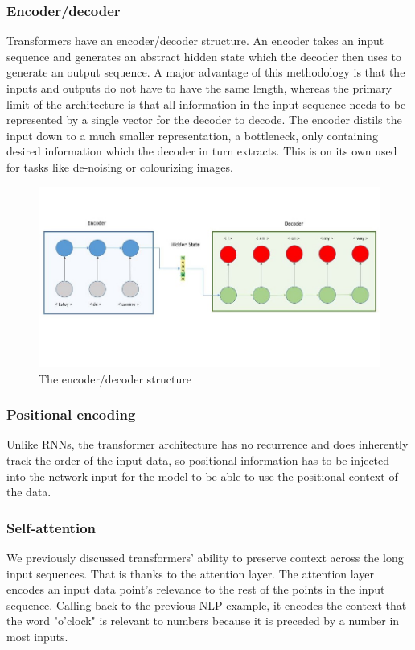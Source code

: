\subsubsection{Encoder/decoder}
Transformers have an encoder/decoder structure. An encoder takes an input sequence and generates an abstract hidden state which the decoder then uses to generate an output sequence. A major advantage of this methodology is that the inputs and outputs do not have to have the same length, whereas the primary limit of the architecture is that all information in the input sequence needs to be represented by a single vector for the decoder to decode. The encoder distils the input down to a much smaller representation, a bottleneck, only containing desired information which the decoder in turn extracts. This is on its own used for tasks like de-noising or colourizing images. 

\begin{figure}[ht!]
    \centering
    \includegraphics[scale=0.5]{imgs/encoder_decoder.jpeg}
    \caption{The encoder/decoder structure \cite{nechu_what_2020}
    \label{fig:encoder_decoder}}
\end{figure}

\subsubsection{Positional encoding}
Unlike RNNs, the transformer architecture has no recurrence and does inherently track the order of the input data, so positional information has to be injected into the network input for the model to be able to use the positional context of the data.\cite{vaswani_attention_2017}

\subsubsection{Self-attention} We previously discussed transformers' ability to preserve context across the long input sequences. That is thanks to the attention layer. The attention layer encodes an input data point's relevance to the rest of the points in the input sequence. Calling back to the previous NLP example, it encodes the context that the word "o'clock" is relevant to numbers because it is preceded by a number in most inputs.
 
